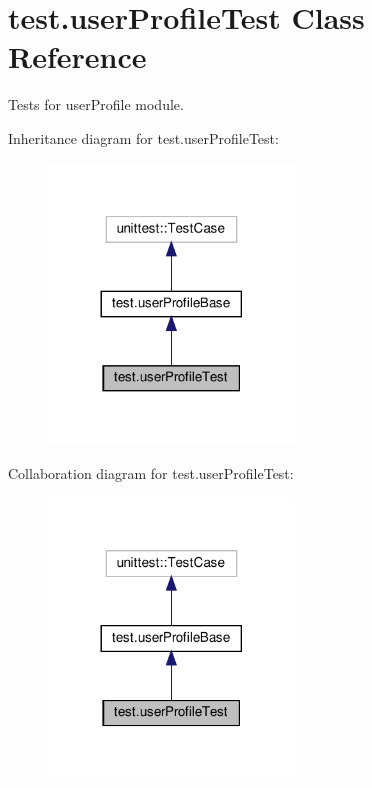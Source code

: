 \hypertarget{classtest_1_1userProfileTest}{}\section{test.\+user\+Profile\+Test Class Reference}
\label{classtest_1_1userProfileTest}


Tests for user\+Profile module.  




Inheritance diagram for test.\+user\+Profile\+Test\+:\nopagebreak
\begin{figure}[H]
\begin{center}
\leavevmode
\includegraphics[width=185pt]{classtest_1_1userProfileTest__inherit__graph}
\end{center}
\end{figure}


Collaboration diagram for test.\+user\+Profile\+Test\+:\nopagebreak
\begin{figure}[H]
\begin{center}
\leavevmode
\includegraphics[width=185pt]{classtest_1_1userProfileTest__coll__graph}
\end{center}
\end{figure}
